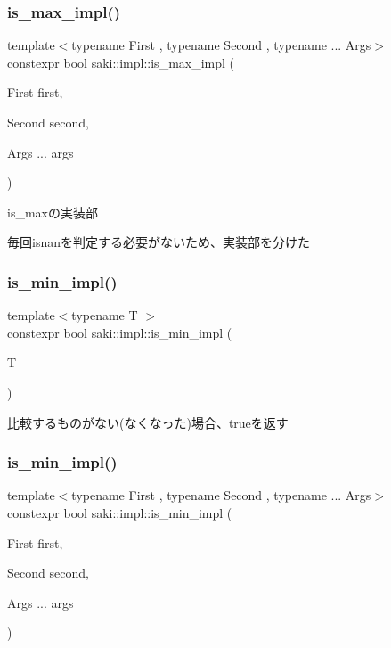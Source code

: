 \subsubsection{\texorpdfstring{is\+\_\+max\+\_\+impl()}{is\_max\_impl()}\hspace{0.1cm}{\footnotesize\ttfamily [2/2]}}
{\footnotesize\ttfamily template$<$typename First , typename Second , typename ... Args$>$ \\
constexpr bool saki\+::impl\+::is\+\_\+max\+\_\+impl (\begin{DoxyParamCaption}\item[{First}]{first,  }\item[{Second}]{second,  }\item[{Args ...}]{args }\end{DoxyParamCaption})}



is\+\_\+maxの実装部 

毎回isnanを判定する必要がないため、実装部を分けた \mbox{\label{namespacesaki_1_1impl_ae9830acbba1cfee8006bd7c0c59cd6df}} 
\subsubsection{\texorpdfstring{is\+\_\+min\+\_\+impl()}{is\_min\_impl()}\hspace{0.1cm}{\footnotesize\ttfamily [1/2]}}
{\footnotesize\ttfamily template$<$typename T $>$ \\
constexpr bool saki\+::impl\+::is\+\_\+min\+\_\+impl (\begin{DoxyParamCaption}\item[{T}]{ }\end{DoxyParamCaption})}



比較するものがない(なくなった)場合、trueを返す 

\mbox{\label{namespacesaki_1_1impl_a48cbdb55a841933db26e4857720738bb}} 
\subsubsection{\texorpdfstring{is\+\_\+min\+\_\+impl()}{is\_min\_impl()}\hspace{0.1cm}{\footnotesize\ttfamily [2/2]}}
{\footnotesize\ttfamily template$<$typename First , typename Second , typename ... Args$>$ \\
constexpr bool saki\+::impl\+::is\+\_\+min\+\_\+impl (\begin{DoxyParamCaption}\item[{First}]{first,  }\item[{Second}]{second,  }\item[{Args ...}]{args }\end{DoxyParamCaption})}



